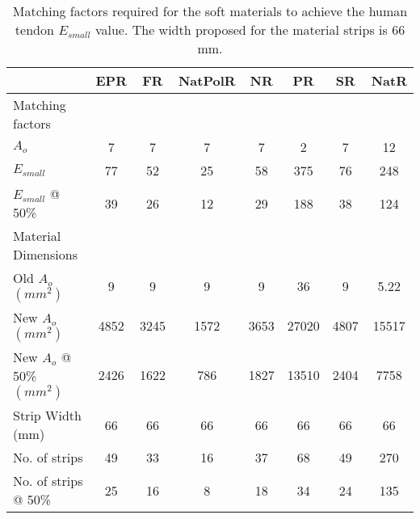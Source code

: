 \begin{table}[htbp!]
    \centering
    \caption{Matching factors required for the soft materials to achieve the human tendon $E_{small}$ value. The width proposed for the material strips is 66 mm.}
    \begin{tabular}{lccccccc}
    \toprule
                            & EPR & FR & NatPolR & NR & PR & SR & NatR \\
    \hline
    Matching factors \\
    \hline
    $A_o$                   & 7 & 7 & 7 & 7 & 2 & 7 & 12\\
    $E_{small}$              & 77                     & 52           & 25                     & 58      & 375          & 76       & 248           \\
    $E_{small}$ @ 50\%                          & 39                     & 26           & 12                     & 29      & 188          & 38       & 124           \\
    \hline
    Material Dimensions \\
    \midrule
    Old $A_o$ $(mm^2)$              & 9 & 9 & 9 & 9 & 36    & 9 & 5.22  \\
    New $A_o$ $(mm^2)$         & 4852                   & 3245         & 1572                   & 3653    & 27020        & 4807     & 15517         \\
    New $A_o$ @ 50\% $(mm^2)$  & 2426                   & 1622         & 786                    & 1827    & 13510        & 2404     & 7758          \\
    Strip Width (mm)       & 66  & 66    & 66    & 66    & 66    & 66    & 66    \\
    No. of strips          & 49    & 33    & 16    & 37    & 68    & 49   & 270  \\
    No. of strips @ 50\%   & 25    & 16    & 8     & 18    & 34    & 24   & 135  \\
    \bottomrule
    \end{tabular}
    \label{tbl:matching}
\end{table}

